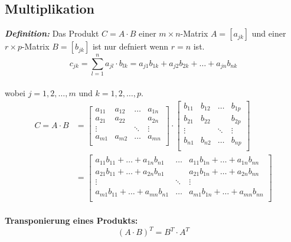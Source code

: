 \subsection*{Multiplikation}
\textbf{\textit{Definition:}} Das Produkt $C=A\cdot B$ einer $m \times n$-Matrix $A=[a_{jk}]$ und einer $r \times p$-Matrix $B=[b_{jk}]$ ist nur defniert wenn $r=n$ ist.\\
\[
	c_{jk} = \sum_{l=1}^{n} a_{jl} \cdot b_{lk} = a_{j1}b_{1k} + a_{j2}b_{2k} + \ldots + a_{jn}b_{nk}
\]
\\
wobei $j=1,2,\ldots,m$ und $k = 1,2,\ldots,p$.
\[
\begin{aligned}
	C =A \cdot B &= 
	\begin{bmatrix}
		a_{11} & a_{12} & \ldots & a_{1n} \\
		a_{21} & a_{22} &  & a_{2n} \\
		\vdots &  & \ddots & \vdots \\
		a_{m1} & a_{m2} & \ldots & a_{mn} \\
	\end{bmatrix} \cdot
	\begin{bmatrix}
		b_{11} & b_{12} & \ldots & b_{1p} \\
		b_{21} & b_{22} &  & b_{2p} \\
		\vdots &  & \ddots & \vdots \\
		b_{n1} & b_{n2} & \ldots & b_{np} \\
	\end{bmatrix}\\ &= 
	\begin{bmatrix}
		a_{11}b_{11} + \ldots + a_{1n}b_{n1} &  \ldots & a_{11}b_{1n} + \ldots + a_{1n}b_{nn} \\
		a_{21}b_{11} + \ldots + a_{2n}b_{n1} &  & a_{21}b_{1n} + \ldots + a_{2n}b_{nn} \\
		\vdots & \ddots & \vdots \\
		a_{m1}b_{11} + \ldots + a_{mn}b_{n1} & \ldots & a_{m1}b_{1n} + \ldots + a_{mn}b_{nn} \\
	\end{bmatrix}
\end{aligned}
\]
\\
\textbf{Transponierung eines Produkts:}
\[
	\left(A\cdot B\right)^T = B^T \cdot A^T
\]
